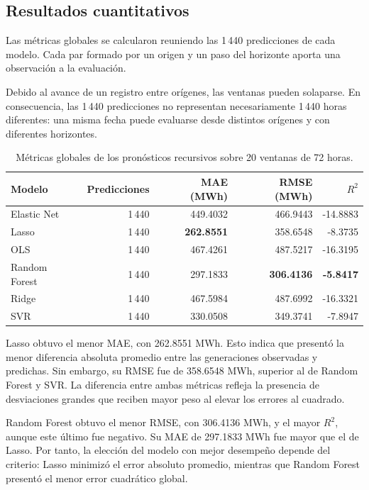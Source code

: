 \subsection{Resultados cuantitativos}

Las métricas globales se calcularon reuniendo las 1\,440 predicciones de cada modelo. Cada par formado por un origen y un paso del horizonte aporta una observación a la evaluación.

Debido al avance de un registro entre orígenes, las ventanas pueden solaparse. En consecuencia, las 1\,440 predicciones no representan necesariamente 1\,440 horas diferentes: una misma fecha puede evaluarse desde distintos orígenes y con diferentes horizontes.

\begin{table}[htbp]
    \centering
    \caption{Métricas globales de los pronósticos recursivos sobre 20 ventanas de 72 horas.}
    \label{tab:resultados-recursivos}
    \begin{tabular}{lrrrr}
        \toprule
        Modelo & Predicciones & MAE (MWh) & RMSE (MWh) & $R^2$ \\
        \midrule
        Elastic Net   & 1\,440 & 449.4032 & 466.9443 & -14.8883 \\
        Lasso         & 1\,440 & \textbf{262.8551} & 358.6548 & -8.3735 \\
        OLS           & 1\,440 & 467.4261 & 487.5217 & -16.3195 \\
        Random Forest & 1\,440 & 297.1833 & \textbf{306.4136} & \textbf{-5.8417} \\
        Ridge         & 1\,440 & 467.5984 & 487.6992 & -16.3321 \\
        SVR           & 1\,440 & 330.0508 & 349.3741 & -7.8947 \\
        \bottomrule
    \end{tabular}
\end{table}

Lasso obtuvo el menor MAE, con 262.8551 MWh. Esto indica que presentó la menor diferencia absoluta promedio entre las generaciones observadas y predichas. Sin embargo, su RMSE fue de 358.6548 MWh, superior al de Random Forest y SVR. La diferencia entre ambas métricas refleja la presencia de desviaciones grandes que reciben mayor peso al elevar los errores al cuadrado.

Random Forest obtuvo el menor RMSE, con 306.4136 MWh, y el mayor $R^2$, aunque este último fue negativo. Su MAE de 297.1833 MWh fue mayor que el de Lasso. Por tanto, la elección del modelo con mejor desempeño depende del criterio: Lasso minimizó el error absoluto promedio, mientras que Random Forest presentó el menor error cuadrático global.

